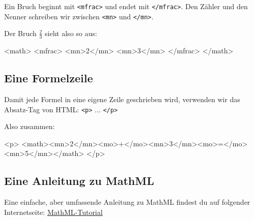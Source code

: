 Ein Bruch beginnt mit \texttt{<mfrac>} und endet mit \texttt{</mfrac>}. Den Zähler und den Nenner schreiben wir zwischen \texttt{<mn>} und \texttt{</mn>}.

Der Bruch $\frac{2}{3}$ sieht also so aus:

\begin{codeHTML}
<math>
	<mfrac>
		<mn>2</mn>
		<mn>3</mn>
	</mfrac>
</math>
\end{codeHTML}

\subsection*{Eine Formelzeile}

Damit jede Formel in eine eigene Zeile geschrieben wird, verwenden wir das Absatz-Tag von HTML: \texttt{<p>} ... \texttt{</p>}

Also zusammen:
\begin{codeHTML}
<p>
	<math><mn>2</mn><mo>+</mo><mn>3</mn><mo>=</mo><mn>5</mn></math>
</p>
\end{codeHTML}

\subsection*{Eine Anleitung zu MathML}

Eine einfache, aber umfassende Anleitung zu MathML findest du auf folgender Internetseite: \href{https://www.math-it.de/Publikationen/MathML_de.html}{MathML-Tutorial}